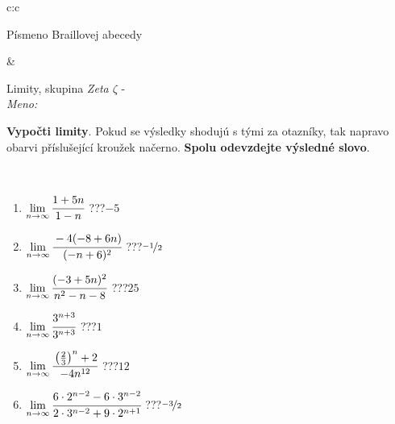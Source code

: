 \documentclass[10pt]{report}
\begin{document}
\begin{tabular}{c:c}
\begin{minipage}[c][104.5mm][t]{0.5\linewidth}
\begin{center}
\begin{minipage}{0.20\linewidth}
\begin{center}
{\small Písmeno Braillovej abecedy}
\end{center}
\end{minipage}
\end{center}
\end{minipage}
&
\begin{minipage}[c][104.5mm][t]{0.5\linewidth}
\begin{center}
\vspace{7mm}
{\huge Limity, skupina \textit{Zeta $\zeta$} -}\\[5mm]
\textit{Meno:}\phantom{xxxxxxxxxxxxxxxxxxxxxxxxxxxxxxxxxxxxxxxxxxxxxxxxxxxxxxxxxxxxxxxxx}\\[5mm]
\begin{minipage}{0.95\linewidth}
\begin{center}
\textbf{Vypočti limity}. Pokud se výsledky shodujú s tými za otazníky, tak napravo\\obarvi příslušející kroužek načerno. \textbf{Spolu odevzdejte výsledné slovo}.
\end{center}
\end{minipage}
\\[1mm]
\begin{minipage}{0.79\linewidth}
\begin{center}
\begin{varwidth}{\linewidth}
\begin{enumerate}
\normalsize
\item $\lim\limits_{n\to\infty}\cfrac{1+5n}{1-n}$\quad \dotfill\; ???\;\dotfill \quad $-5$
\item $\lim\limits_{n\to\infty}\cfrac{-4(-8+6n)}{(-n+6)^2}$\quad \dotfill\; ???\;\dotfill \quad $\nicefrac{-1}{2}$
\item $\lim\limits_{n\to\infty}\cfrac{(-3+5n)^2}{n^2-n-8}$\quad \dotfill\; ???\;\dotfill \quad $25$
\item $\lim\limits_{n\to\infty}\cfrac{3^{n+3}}{3^{n+3}}$\quad \dotfill\; ???\;\dotfill \quad $1$
\item $\lim\limits_{n\to\infty}\cfrac{\left(\frac{2}{3}\right)^n +2}{-4n^{12}}$\quad \dotfill\; ???\;\dotfill \quad $12$
\item $\lim\limits_{n\to\infty}\cfrac{6\cdot 2^{n-2}-6\cdot 3^{n-2}}{2\cdot 3^{n-2}+9\cdot 2^{n+1}}$\quad \dotfill\; ???\;\dotfill \quad $\nicefrac{-3}{2}$
\end{enumerate}
\end{varwidth}
\end{center}
\end{minipage}
\begin{minipage}{0.20\linewidth}

\end{minipage}
\end{center}
\end{minipage}
\end{tabular}
\end{document}
